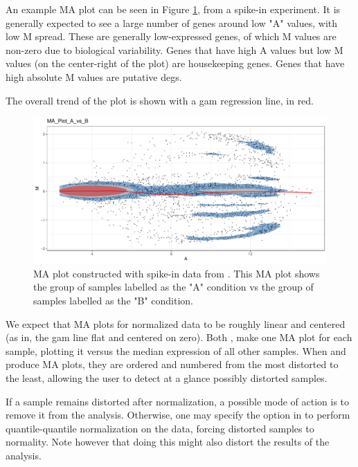An example MA plot can be seen in Figure \ref{fig:PlatinumMAplot}, from a spike-in experiment. It is generally expected to see a large number of genes around low "A" values, with low M spread. These are generally low-expressed genes, of which M values are non-zero due to biological variability. Genes that have high A values but low M values (on the center-right of the plot) are housekeeping genes. Genes that have high absolute M values are putative \glspl{deg}.

The overall trend of the plot is shown with a \gls{gam} regression line, in red.

\begin{figure}
    \centering
    \includegraphics{resources/images/3_MA_Plot_A_vs_B.pdf}
    \caption{MA plot constructed with spike-in data from \textcite{zhuPreferredAnalysisMethods2010}. This MA plot shows the group of samples labelled as the "A" condition vs the group of samples labelled as the "B" condition.}
    \label{fig:PlatinumMAplot}
\end{figure}

We expect that MA plots for normalized data to be roughly linear and centered (as in, the \gls{gam} line flat and centered on zero). Both ,  make one MA plot for each sample, plotting it versus the median expression of all other samples. When  and  produce MA plots, they are ordered and numbered from the most distorted to the least, allowing the user to detect at a glance possibly distorted samples.

If a sample remains distorted after normalization, a possible mode of action is to remove it from the analysis. Otherwise, one may specify the  option in  to perform quantile-quantile normalization on the data, forcing distorted samples to normality. Note however that doing this might also distort the results of the analysis.

